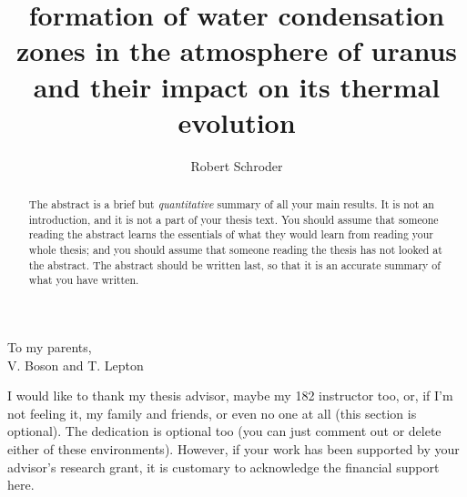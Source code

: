 \documentclass[11pt]{ucscthesisbs}
\begin{document}

\title{formation of water condensation zones in the atmosphere of uranus and their impact on its thermal evolution}
\author{Robert Schroder}
%
%



\maketitle
\copyrightpage

\begin{frontmatter}

\begin{abstract}
The abstract is a brief but {\it quantitative} summary of all your main results.  It is not an introduction, and it is not a part of your thesis text.  You should assume that someone reading the abstract learns the essentials of what they would learn from reading your whole thesis; and you should assume that someone reading the thesis has not looked at the abstract.  The abstract should be written last, so that it is an accurate summary of what you have written.
\end{abstract}

\tableofcontents
%
%
\listoffigures
\listoftables

\begin{dedication}
\null\vfil
{\large
\begin{center}
To my parents,\\\vspace{12pt}
V. Boson and T. Lepton
\end{center}}
\vfil\null
\end{dedication}

\begin{acknowledgements}
I would like to thank my thesis advisor, maybe my 182 instructor too, or, if I'm not feeling it, my family and friends, or even no one at all (this section is optional).  The dedication is optional too (you can just comment out or delete either of these environments).  However, if your work has been supported by your advisor's research grant, it is customary to acknowledge the financial support here.
\end{acknowledgements}


\end{frontmatter}
\end{document}
